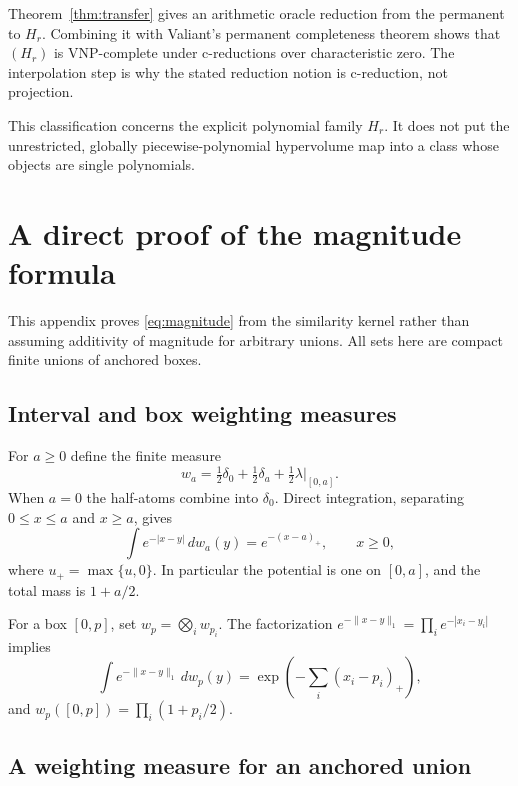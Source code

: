 \documentclass[12pt,a4paper]{article}
\theoremstyle{definition}
\theoremstyle{remark}
\newcommand{\VNP}{\mathrm{VNP}}
\begin{document}
Theorem~\ref{thm:transfer} gives an arithmetic oracle reduction from
the permanent to $H_r$. Combining it with Valiant's permanent
completeness theorem \cite{ValiantAlgebra} shows that $(H_r)$ is
$\VNP$-complete under c-reductions over characteristic zero. The
interpolation step is why the stated reduction notion is c-reduction,
not projection.

This classification concerns the explicit polynomial family $H_r$.
It does not put the unrestricted, globally piecewise-polynomial
hypervolume map into a class whose objects are single polynomials.

\section{A direct proof of the magnitude formula}
\label{app:magnitude}

This appendix proves \eqref{eq:magnitude} from the similarity kernel
rather than assuming additivity of magnitude for arbitrary unions.
All sets here are compact finite unions of anchored boxes.

\subsection{Interval and box weighting measures}

For $a\ge0$ define the finite measure
\[
 w_a=\tfrac12\delta_0+\tfrac12\delta_a
                   +\tfrac12\lambda|_{[0,a]}.
\]
When $a=0$ the half-atoms combine into $\delta_0$. Direct integration,
separating $0\le x\le a$ and $x\ge a$, gives
\begin{equation}
 \int e^{-|x-y|}\,dw_a(y)=e^{-(x-a)_+},\qquad x\ge0,
 \label{eq:interval-potential}
\end{equation}
where $u_+=\max\{u,0\}$. In particular the potential is one on
$[0,a]$, and the total mass is $1+a/2$.

For a box $[0,p]$, set $w_p=\bigotimes_iw_{p_i}$. The factorization
$e^{-\|x-y\|_1}=\prod_i e^{-|x_i-y_i|}$ implies
\begin{equation}
 \int e^{-\|x-y\|_1}\,dw_p(y)
       =\exp\!\left(-\sum_i(x_i-p_i)_+\right),
 \label{eq:box-potential}
\end{equation}
and $w_p([0,p])=\prod_i(1+p_i/2)$.

\subsection{A weighting measure for an anchored union}
\end{document}
